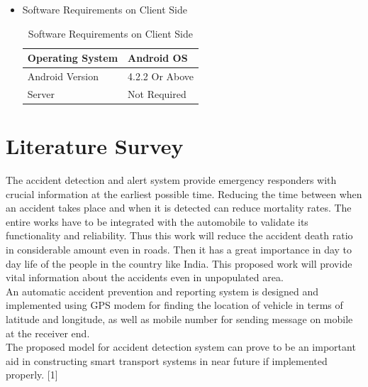 \documentclass{article}
\begin{document}
\begin{flushleft}
\begin{itemize}
\begin{center}
\begin{table}[!ht]
          \end{table}
            
            \end{center}
            
            
            
        \item Software Requirements on Client Side
            \begin{center}
          \begin{table}[!ht]
          \renewcommand\thetable{1.5.3}
              \centering
              \caption{Software Requirements on Client Side}
              \label{"   " "  " }
             \begin{tabular}{ | m{3cm} | m{6cm} | }
           
            \hline
             Operating System & Android OS  \\ \hline
             Android Version & 4.2.2 Or Above   \\  \hline
             Server & Not Required   \\  \hline
            \end{tabular}
              
          \end{table}
            
            \end{center}
            
            
            
            
           
            
            
            \end{itemize}
            
        
        \newpage
    
    \section{Literature Survey}
   The  accident  detection  and  alert  system  provide emergency responders  with crucial  information  at  the earliest possible time. Reducing the time between when an accident  takes place  and when  it is  detected  can reduce mortality  rates.  The  entire  works  have  to  be  integrated with  the  automobile  to  validate  its  functionality  and reliability. Thus this  work will reduce the accident death ratio in considerable  amount even in  roads. Then it has a great importance in day to day life of the people in the  country like  India. This  proposed  work  will  provide vital information about the accidents even in unpopulated area.\\ An automatic accident prevention and reporting system is designed  and  implemented  using GPS modem for finding the location of vehicle in terms of latitude and longitude, as  well  as mobile number for  sending  message  on  mobile  at the receiver end.\\  The  proposed  model  for  accident  detection system  can prove  to  be  an  important  aid  in  constructing  smart transport systems in near future  if implemented properly.  [1]
    \newpage
    

\end{flushleft}
\end{document}
